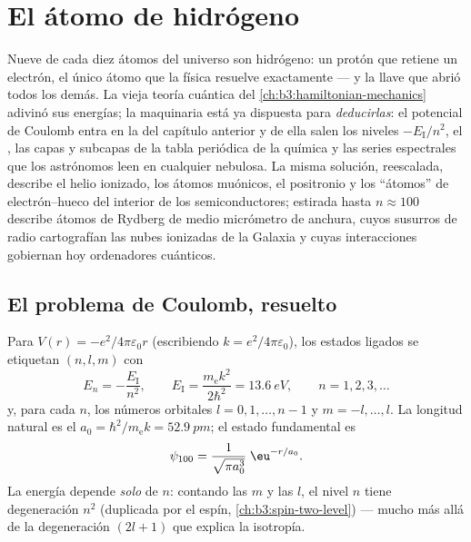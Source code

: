 \chapter{El átomo de hidrógeno}\label{ch:b3:hydrogen-atom}

Nueve de cada diez átomos del universo son hidrógeno: un protón que retiene
un electrón, el único átomo que la física resuelve exactamente --- y la
llave que abrió todos los demás. La vieja teoría cuántica del
\cref{ch:b3:hamiltonian-mechanics} adivinó sus energías; la maquinaria está
ya dispuesta para \emph{deducirlas}: el potencial de Coulomb entra en la
 del capítulo anterior y de ella salen los niveles
$-E_{\text{I}}/n^2$, el , las capas y subcapas de la tabla
periódica de la química y las series espectrales que los astrónomos leen en
cualquier nebulosa. La misma solución, reescalada, describe el helio
ionizado, los átomos muónicos, el positronio y los ``átomos'' de
electrón--hueco del interior de los semiconductores; estirada hasta $n
\approx 100$ describe átomos de Rydberg de medio micrómetro de anchura,
cuyos susurros de radio cartografían las nubes ionizadas de la Galaxia y
cuyas interacciones gobiernan hoy ordenadores cuánticos.

\section{El problema de Coulomb, resuelto}

\begin{theorem}\label{thm:b3:hydrogen-atom:levels}
Para $V(r) = -e^2/4\pi\varepsilon_0 r$ (escribiendo $k = e^2/4\pi
\varepsilon_0$), los estados ligados se etiquetan $(n, l, m)$ con
\[
E_n = -\frac{E_{\text{I}}}{n^2} , \qquad
E_{\text{I}} = \frac{m_{\text{e}}k^2}{2\hbar^2} = \qty{13.6}{eV} ,
\qquad n = 1, 2, 3, \dots
\]
y, para cada $n$, los números orbitales $l = 0, 1, \dots, n-1$ y
$m = -l, \dots, l$. La longitud natural es el  $a_0 =
\hbar^2/m_{\text{e}}k = \qty{52.9}{pm}$; el estado fundamental es
\[
\psi_{100} = \frac{1}{\sqrt{\pi a_0^3}}\;\eu^{-r/a_0} .
\]
La energía depende \emph{solo} de $n$: contando las $m$ y las
$l$, el nivel $n$ tiene degeneración $n^2$ (duplicada por el espín,
\cref{ch:b3:spin-two-level}) --- mucho más allá de la degeneración
$(2l+1)$ que explica la isotropía.
\end{theorem}


